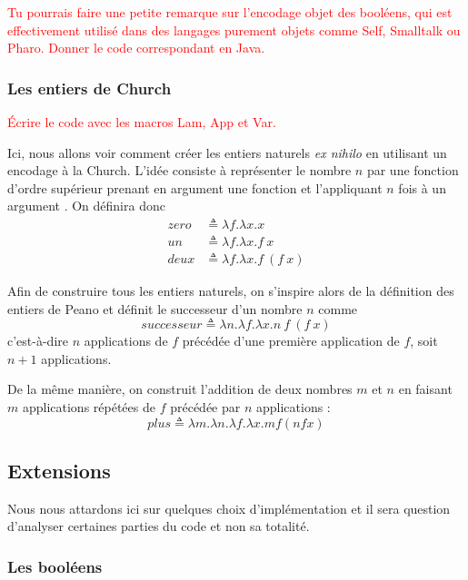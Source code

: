 \documentclass {article}
\theoremstyle{definition}
\theoremstyle{remark}
\newcommand{\todo}[1]{\textcolor{red}{#1}}
\begin{document}
\todo{Tu pourrais faire une petite remarque sur l'encodage objet des
  booléens, qui est effectivement utilisé dans des langages purement
  objets comme Self, Smalltalk ou Pharo. Donner le code correspondant en Java.} 

\subsubsection{Les entiers de Church}

\newcommand{\Zero}{\mathit{zero}}
\newcommand{\Un}{\mathit{un}}
\newcommand{\Deux}{\mathit{deux}}
\newcommand{\Succ}{\mathit{successeur}}
\newcommand{\Plus}{\mathit{plus}}

\todo{Écrire le code avec les macros Lam, App et Var.}

Ici, nous allons voir comment créer les entiers naturels \textit{ex
  nihilo} en utilisant un encodage à la Church. L'idée consiste à
représenter le nombre \(n\) par une fonction d'ordre supérieur prenant
en argument une fonction  et l'appliquant \(n\) fois à un
argument . On définira donc
%
\begin{align*}
\Zero &\triangleq \lambda f. \lambda x. x \\
\Un   &\triangleq \lambda f. \lambda x. f\: x \\
\Deux &\triangleq \lambda f. \lambda x. f\: (f\: x)
\end{align*}

Afin de construire tous les entiers naturels, on s'inspire alors de la
définition des entiers de Peano et définit le successeur d'un nombre \(n\)
comme
%
\[
\Succ \triangleq \lambda n. \lambda f. \lambda x. n\: f\: (f\: x)
\]
%
c'est-à-dire \(n\) applications de \(f\) précédée d'une première
application de \(f\), soit \(n+1\) applications.

De la même manière, on construit l'addition de deux nombres \(m\) et
\(n\) en faisant \(m\) applications répétées de \(f\) précédée par
\(n\) applications :
%
\[
\Plus \triangleq \lambda m. \lambda n. \lambda f. \lambda x. m f (n f x)
\]


\subsection{Extensions}

Nous nous attardons ici sur quelques choix d'implémentation et il
sera question d'analyser certaines parties du code et non sa totalité.

\subsubsection{Les booléens}
\end{document}
